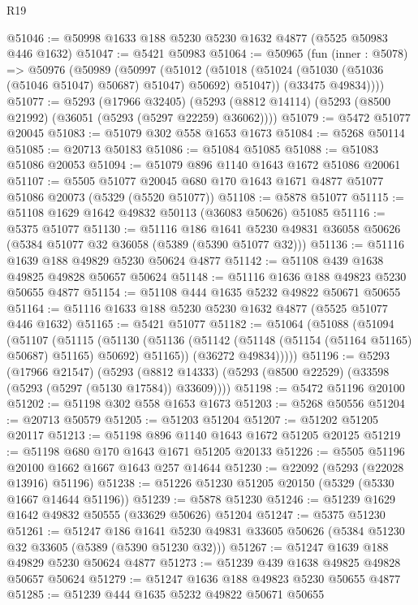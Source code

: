 \begin{lexlean}{R19}
\begin{coremodule}
@51046 := @50998 @1633 @188 @5230 @5230 @1632 @4877 (@5525 @50983 @446 @1632)
@51047 := @5421 @50983
@51064 := @50965
    (fun (inner : @5078) =>
    @50976
      (@50989
        (@50997
          (@51012 (@51018 (@51024 (@51030 (@51036 (@51046 @51047) @50687) @51047) @50692) @51047))
          (@33475 @49834))))
@51077 := @5293
    (@17966 @32405)
    (@5293 (@8812 @14114) (@5293 (@8500 @21992) (@36051 (@5293 (@5297 @22259) @36062))))
@51079 := @5472 @51077 @20045
@51083 := @51079 @302 @558 @1653 @1673
@51084 := @5268 @50114
@51085 := @20713 @50183
@51086 := @51084 @51085
@51088 := @51083 @51086 @20053
@51094 := @51079 @896 @1140 @1643 @1672 @51086 @20061
@51107 := @5505
    @51077
    @20045
    @680
    @170
    @1643
    @1671
    @4877
    @51077
    @51086
    @20073
    (@5329 (@5520 @51077))
@51108 := @5878 @51077
@51115 := @51108 @1629 @1642 @49832 @50113 (@36083 @50626) @51085
@51116 := @5375 @51077
@51130 := @51116
    @186
    @1641
    @5230
    @49831
    @36058
    @50626
    (@5384 @51077 @32 @36058 (@5389 (@5390 @51077 @32)))
@51136 := @51116 @1639 @188 @49829 @5230 @50624 @4877
@51142 := @51108 @439 @1638 @49825 @49828 @50657 @50624
@51148 := @51116 @1636 @188 @49823 @5230 @50655 @4877
@51154 := @51108 @444 @1635 @5232 @49822 @50671 @50655
@51164 := @51116 @1633 @188 @5230 @5230 @1632 @4877 (@5525 @51077 @446 @1632)
@51165 := @5421 @51077
@51182 := @51064
    (@51088
      (@51094
        (@51107
          (@51115
            (@51130 (@51136 (@51142 (@51148 (@51154 (@51164 @51165) @50687) @51165) @50692) @51165))
            (@36272 @49834)))))
@51196 := @5293
    (@17966 @21547)
    (@5293 (@8812 @14333) (@5293 (@8500 @22529) (@33598 (@5293 (@5297 (@5130 @17584)) @33609))))
@51198 := @5472 @51196 @20100
@51202 := @51198 @302 @558 @1653 @1673
@51203 := @5268 @50556
@51204 := @20713 @50579
@51205 := @51203 @51204
@51207 := @51202 @51205 @20117
@51213 := @51198 @896 @1140 @1643 @1672 @51205 @20125
@51219 := @51198 @680 @170 @1643 @1671 @51205 @20133
@51226 := @5505 @51196 @20100 @1662 @1667 @1643 @257 @14644
@51230 := @22092 (@5293 (@22028 @13916) @51196)
@51238 := @51226 @51230 @51205 @20150 (@5329 (@5330 @1667 @14644 @51196))
@51239 := @5878 @51230
@51246 := @51239 @1629 @1642 @49832 @50555 (@33629 @50626) @51204
@51247 := @5375 @51230
@51261 := @51247
    @186
    @1641
    @5230
    @49831
    @33605
    @50626
    (@5384 @51230 @32 @33605 (@5389 (@5390 @51230 @32)))
@51267 := @51247 @1639 @188 @49829 @5230 @50624 @4877
@51273 := @51239 @439 @1638 @49825 @49828 @50657 @50624
@51279 := @51247 @1636 @188 @49823 @5230 @50655 @4877
@51285 := @51239 @444 @1635 @5232 @49822 @50671 @50655

\end{coremodule}
\end{lexlean}
